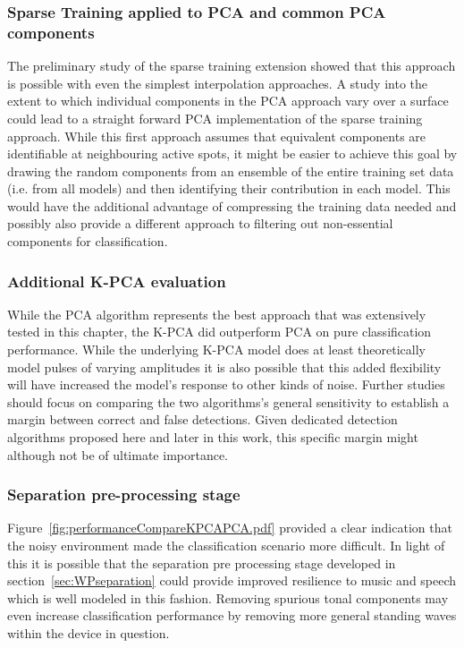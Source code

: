 \subsubsection{Sparse Training applied to PCA and common PCA components}
The preliminary study of the sparse training extension showed that this approach is possible with even the simplest interpolation approaches. A study into the extent to which individual components in the PCA approach vary over a surface could lead to a straight forward PCA implementation of the sparse training approach. While this first approach assumes that equivalent components are identifiable at neighbouring active spots, it might be easier to achieve this goal by drawing the random components from an ensemble of the entire training set data (i.e. from all models) and then identifying their contribution in each model. This would have the additional advantage of compressing the training data needed and possibly also provide a different approach to filtering out non-essential components for classification.

\subsubsection{Additional K-PCA evaluation}
While the PCA algorithm represents the best approach that was extensively tested in this chapter, the K-PCA did outperform PCA on pure classification performance. While the underlying K-PCA model does at least theoretically model pulses of varying amplitudes it is also possible that this added flexibility will have increased the model's response to other kinds of noise. Further studies should focus on comparing the two algorithms's general sensitivity to establish a margin between correct and false detections. Given dedicated detection algorithms proposed here and later in this work, this specific margin might although not be of ultimate importance.

\subsubsection{Separation pre-processing stage}
Figure~\ref{fig:performanceCompareKPCAPCA.pdf} provided a clear indication that the noisy environment made the classification scenario more difficult. In light of this it is possible that the separation pre processing stage developed in section~\ref{sec:WPseparation} could provide improved resilience to music and speech which is well modeled in this fashion. Removing spurious tonal components may even increase classification performance by removing more general standing waves within the device in question.


